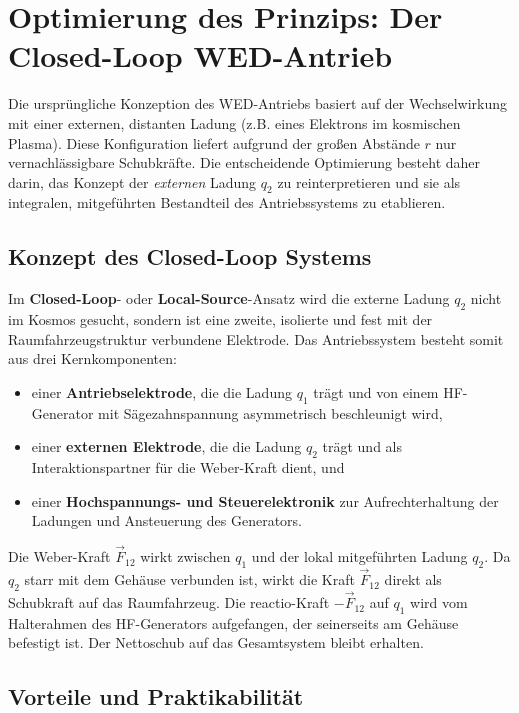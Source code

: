 \documentclass[11pt, a4paper]{article}
\begin{document}
\section{Optimierung des Prinzips: Der Closed-Loop WED-Antrieb}

Die ursprüngliche Konzeption des WED-Antriebs basiert auf der Wechselwirkung mit einer externen, distanten Ladung (z.B. eines Elektrons im kosmischen Plasma). Diese
Konfiguration liefert aufgrund der großen Abstände $r$ nur vernachlässigbare Schubkräfte. Die entscheidende Optimierung besteht daher darin, das Konzept der \textit{externen}
Ladung $q_2$ zu reinterpretieren und sie als integralen, mitgeführten Bestandteil des Antriebssystems zu etablieren.

\subsection{Konzept des Closed-Loop Systems}

Im \textbf{Closed-Loop}- oder \textbf{Local-Source}-Ansatz wird die externe Ladung $q_2$ nicht im Kosmos gesucht, sondern ist eine zweite, isolierte und fest mit der Raumfahrzeugstruktur verbundene Elektrode. Das Antriebssystem besteht somit aus drei Kernkomponenten:
\begin{itemize}
    \item einer \textbf{Antriebselektrode}, die die Ladung $q_1$ trägt und von einem HF-Generator mit Sägezahnspannung asymmetrisch beschleunigt wird,
    \item einer \textbf{externen Elektrode}, die die Ladung $q_2$ trägt und als Interaktionspartner für die Weber-Kraft dient, und
    \item einer \textbf{Hochspannungs- und Steuerelektronik} zur Aufrechterhaltung der Ladungen und Ansteuerung des Generators.
\end{itemize}

Die Weber-Kraft $\vec{F}_{12}$ wirkt zwischen $q_1$ und der lokal mitgeführten Ladung $q_2$. Da $q_2$ starr mit dem Gehäuse verbunden ist, wirkt die Kraft $\vec{F}_{12}$ direkt als Schubkraft auf das Raumfahrzeug. Die reactio-Kraft $-\vec{F}_{12}$ auf $q_1$ wird vom Halterahmen des HF-Generators aufgefangen, der seinerseits am Gehäuse befestigt ist. Der Nettoschub auf das Gesamtsystem bleibt erhalten.

\subsection{Vorteile und Praktikabilität}
\end{document}
